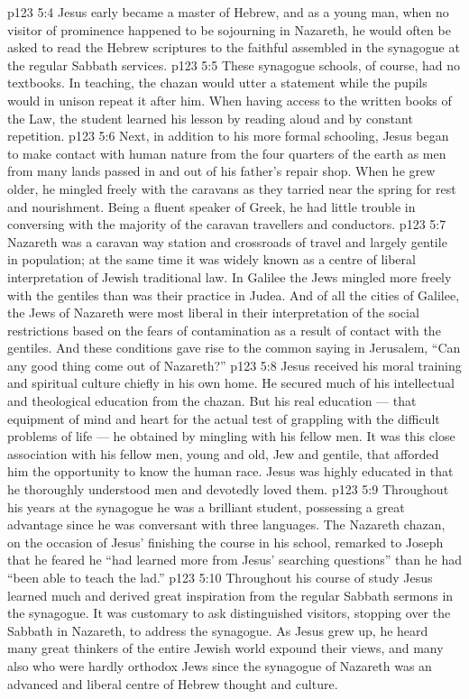 \vs p123 5:4 Jesus early became a master of Hebrew, and as a young man, when no visitor of prominence happened to be sojourning in Nazareth, he would often be asked to read the Hebrew scriptures to the faithful assembled in the synagogue at the regular Sabbath services.
\vs p123 5:5 These synagogue schools, of course, had no textbooks. In teaching, the chazan would utter a statement while the pupils would in unison repeat it after him. When having access to the written books of the Law, the student learned his lesson by reading aloud and by constant repetition.
\vs p123 5:6 \pc Next, in addition to his more formal schooling, Jesus began to make contact with human nature from the four quarters of the earth as men from many lands passed in and out of his father’s repair shop. When he grew older, he mingled freely with the caravans as they tarried near the spring for rest and nourishment. Being a fluent speaker of Greek, he had little trouble in conversing with the majority of the caravan travellers and conductors.
\vs p123 5:7 Nazareth was a caravan way station and crossroads of travel and largely gentile in population; at the same time it was widely known as a centre of liberal interpretation of Jewish traditional law. In Galilee the Jews mingled more freely with the gentiles than was their practice in Judea. And of all the cities of Galilee, the Jews of Nazareth were most liberal in their interpretation of the social restrictions based on the fears of contamination as a result of contact with the gentiles. And these conditions gave rise to the common saying in Jerusalem, “Can any good thing come out of Nazareth?”
\vs p123 5:8 Jesus received his moral training and spiritual culture chiefly in his own home. He secured much of his intellectual and theological education from the chazan. But his real education --- that equipment of mind and heart for the actual test of grappling with the difficult problems of life --- he obtained by mingling with his fellow men. It was this close association with his fellow men, young and old, Jew and gentile, that afforded him the opportunity to know the human race. Jesus was highly educated in that he thoroughly understood men and devotedly loved them.
\vs p123 5:9 \pc Throughout his years at the synagogue he was a brilliant student, possessing a great advantage since he was conversant with three languages. The Nazareth chazan, on the occasion of Jesus’ finishing the course in his school, remarked to Joseph that he feared he “had learned more from Jesus’ searching questions” than he had “been able to teach the lad.”
\vs p123 5:10 Throughout his course of study Jesus learned much and derived great inspiration from the regular Sabbath sermons in the synagogue. It was customary to ask distinguished visitors, stopping over the Sabbath in Nazareth, to address the synagogue. As Jesus grew up, he heard many great thinkers of the entire Jewish world expound their views, and many also who were hardly orthodox Jews since the synagogue of Nazareth was an advanced and liberal centre of Hebrew thought and culture.
